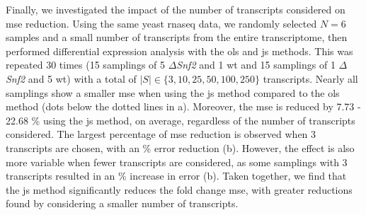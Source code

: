 Finally, we investigated the impact of the number of transcripts considered on \gls{mse} reduction.
Using the same yeast \gls{rnaseq} data, we randomly selected $N = 6$ samples and a small number of transcripts from the entire transcriptome, then performed differential expression analysis with the \gls{ols} and \gls{js} methods.
This was repeated 30 times (15 samplings of 5 $\Delta$\emph{Snf2} and 1 \gls{wt} and 15 samplings of 1 $\Delta$\emph{Snf2} and 5 \gls{wt}) with a total of $|S| \in \{ 3, 10, 25, 50, 100, 250 \}$ transcripts.
Nearly all samplings show a smaller \gls{mse} when using the \gls{js} method compared to the \gls{ols} method (dots below the dotted lines in a).
Moreover, the \gls{mse} is reduced by 7.73 - 22.68 \% using the \gls{js} method, on average, regardless of the number of transcripts considered.
The largest percentage of \gls{mse} reduction is observed when 3 transcripts are chosen, with an  \% error reduction (b).
However, the effect is also more variable when fewer transcripts are considered, as some samplings with 3 transcripts resulted in an  \% increase in error (b).
Taken together, we find that the \gls{js} method significantly reduces the fold change \gls{mse}, with greater reductions found by considering a smaller number of transcripts.

